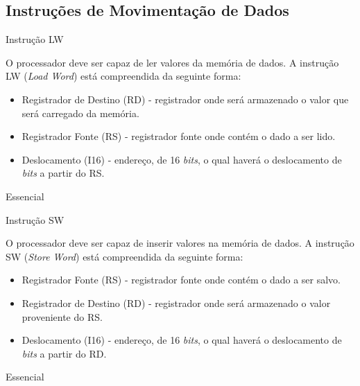 \documentclass{article}
\begin{document}
  \subsection{Instruções de Movimentação de Dados}
    \begin{functional}
     \requirement
      {Instrução LW}
      {O processador deve ser capaz de ler valores da memória de dados.
       A instrução LW (\textit{Load Word}) está compreendida da seguinte forma:\\
       \begin{itemize}
        \item Registrador de Destino (RD) - registrador onde será armazenado o valor que será carregado da memória.
        \item Registrador Fonte (RS) - registrador fonte onde contém o dado a ser lido.
        \item Deslocamento (I16) - endereço, de 16 \textit{bits}, o qual haverá o deslocamento de \textit{bits} a partir do RS.
       \end{itemize}
       }
      {Essencial}

     \requirement
      {Instrução SW}
      {O processador deve ser capaz de inserir valores na memória de dados.
      A instrução SW (\textit{Store Word}) está compreendida da seguinte forma:\\
       \begin{itemize}
        \item Registrador Fonte (RS) - registrador fonte onde contém o dado a ser salvo.
        \item Registrador de Destino (RD) - registrador onde será armazenado o valor proveniente do RS.
        \item Deslocamento (I16) - endereço, de 16 \textit{bits}, o qual haverá o deslocamento de \textit{bits} a partir do RD.
       \end{itemize}
       }
      {Essencial}
    \end{functional}
\end{document}
